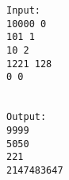 \begin{verbatim}
Input:
10000 0
101 1
10 2
1221 128
0 0


Output:
9999
5050
221
2147483647

\end{verbatim}